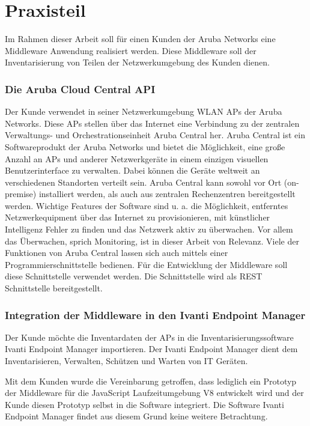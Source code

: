 \chapter{Praxisteil}

Im Rahmen dieser Arbeit soll für einen Kunden der Aruba Networks eine Middleware Anwendung realisiert werden. Diese Middleware soll der Inventarisierung von Teilen der Netzwerkumgebung des Kunden dienen. 

\subsection{Die Aruba Cloud Central API}

Der Kunde verwendet in seiner Netzwerkumgebung WLAN APs der Aruba Networks. Diese APs stellen über das Internet eine Verbindung zu der zentralen Verwaltungs- und Orchestrationseinheit Aruba Central her. Aruba Central ist ein Softwareprodukt der Aruba Networks und bietet die Möglichkeit, eine große Anzahl an APs und anderer Netzwerkgeräte in einem einzigen visuellen Benutzerinterface zu verwalten. Dabei können die Geräte weltweit an verschiedenen Standorten verteilt sein. Aruba Central kann sowohl vor Ort (on-premise) installiert werden, als auch aus zentralen Rechenzentren bereitgestellt werden. Wichtige Features der Software sind u. a. die Möglichkeit, entferntes Netzwerkequipment über das Internet  zu provisionieren, mit künstlicher Intelligenz Fehler zu finden und das Netzwerk aktiv zu überwachen. Vor allem das Überwachen, sprich Monitoring, ist in dieser Arbeit von Relevanz. Viele der Funktionen von Aruba Central lassen sich auch mittels einer Programmierschnittstelle bedienen. Für die Entwicklung der Middleware soll diese Schnittstelle verwendet werden. Die Schnittstelle wird als REST Schnittstelle bereitgestellt.

\subsection{Integration der Middleware in den Ivanti Endpoint Manager}

Der Kunde möchte die Inventardaten der APs in die Inventarisierungssoftware Ivanti Endpoint Manager importieren. Der Ivanti Endpoint Manager dient dem Inventarisieren, Verwalten, Schützen und Warten von IT Geräten. 

Mit dem Kunden wurde die Vereinbarung getroffen, dass lediglich ein Prototyp der Middleware für die JavaScript Laufzeitumgebung V8 entwickelt wird und der Kunde diesen Prototyp selbst in die Software integriert. Die Software Ivanti Endpoint Manager findet aus diesem Grund keine weitere Betrachtung.


